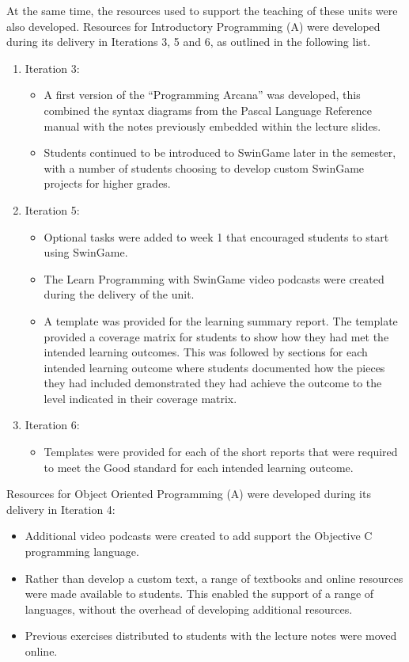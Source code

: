 At the same time, the resources used to support the teaching of these units were also developed. Resources for Introductory Programming (A) were developed during its delivery in Iterations 3, 5 and 6, as outlined in the following list.
\begin{enumerate}
  \item Iteration 3:
  \begin{itemize}[noitemsep,nolistsep]
    \item A first version of the ``Programming Arcana'' was developed, this combined the syntax diagrams from the Pascal Language Reference manual \cite{FPC:2013lang} with the notes previously embedded within the lecture slides.
    \item Students continued to be introduced to SwinGame later in the semester, with a number of students choosing to develop custom SwinGame projects for higher grades. 
  \end{itemize}
  \item Iteration 5:
  \begin{itemize}[noitemsep,nolistsep]
    \item Optional tasks were added to week 1 that encouraged students to start using SwinGame.
    \item The Learn Programming with SwinGame video podcasts were created during the delivery of the unit.
    \item A template was provided for the learning summary report. The template provided a coverage matrix for students to show how they had met the intended learning outcomes. This was followed by sections for each intended learning outcome where students documented how the pieces they had included demonstrated they had achieve the outcome to the level indicated in their coverage matrix.
  \end{itemize}
  \item Iteration 6:
  \begin{itemize}[noitemsep,nolistsep]
    \item Templates were provided for each of the short reports that were required to meet the Good standard for each intended learning outcome.
  \end{itemize}
\end{enumerate}

Resources for Object Oriented Programming (A) were developed during its delivery in Iteration 4:
\begin{itemize}[noitemsep,nolistsep]
	\item Additional video podcasts were created to add support the Objective C programming language.
	\item Rather than develop a custom text, a range of textbooks and online resources were made available to students. This enabled the support of a range of languages, without the overhead of developing additional resources.
	\item Previous exercises distributed to students with the lecture notes were moved online.
\end{itemize}

